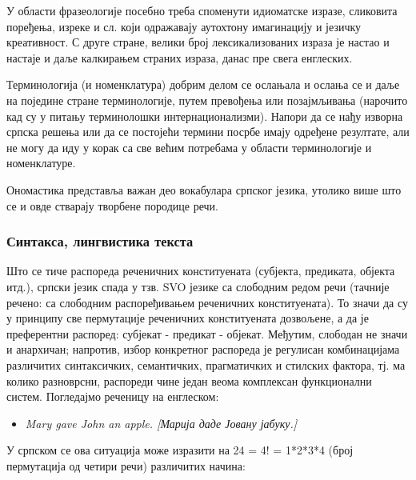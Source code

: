 {\begin{multicols}{2}
У области фразеологије посебно треба споменути идиоматске изразе, сликовита поређења, изреке и сл. који одражавају аутохтону имагинацију и језичку креативност. С друге стране, велики број лексикализованих израза је настао и настаје и даље калкирањем  страних израза, данас пре свега енглеских.

Терминологија (и номенклатура) добрим делом се ослањала и ослања се и даље на поједине стране терминологије, путем превођења или позајмљивања (нарочито кад су у питању терминолошки интернационализми).  Напори да се нађу изворна српска решења или да се постојећи термини посрбе имају одређене резултате, али не могу да иду у корак са све већим потребама у области терминологије и номенклатуре.  

Ономастика представља важан део вокабулара српског језика, утолико више што се и овде стварају творбене породице речи.


\subsubsection {Синтакса, лингвистика текста}
  
Што се тиче распореда реченичних конституената (субјекта, предиката, објекта итд.), српски језик спада у тзв. SVO језике са слободним редом речи (тачније речено: са слободним распоређивањем реченичних конституената). То значи да су у принципу све пермутације реченичних конституената дозвољене, а да је преферентни распоред: субјекат - предикат - објекат. Међутим, слободан не значи и анархичан; напротив, избор конкретног распореда је регулисан комбинацијама различитих синтаксичких, семантичких, прагматичких и стилских фактора, тј. ма колико разноврсни, распореди чине један веома комплексан функционални систем. Погледајмо реченицу на енглеском: 
\begin{itemize}
\item \textit{Mary gave John an apple. [Марија даде Јовану јабуку.]} 
\end{itemize}
У српском се ова ситуација може изразити на 24 = 4! = 1*2*3*4 (број пермутација од четири речи) различитих начина:


\end{multicols}}
